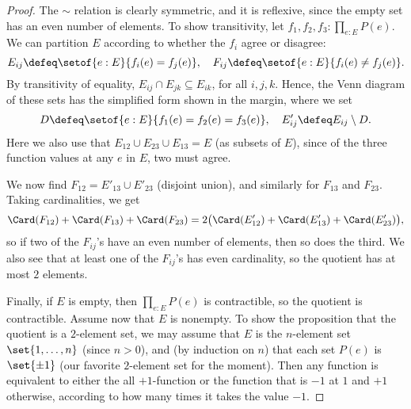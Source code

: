\begin{proof}
  The $\sim$ relation is clearly symmetric, and it is reflexive, since the empty set
  has an even number of elements.
  To show transitivity, let $f_1,f_2,f_3:\prod_{e:E}P(e)$.
  We can partition $E$ according to whether the $f_i$ agree or disagree:
  \[
    E_{ij} \defeq \setof{e:E}{f_i(e) = f_j(e)}, \quad
    F_{ij} \defeq \setof{e:E}{f_i(e) \ne f_j(e)}.
  \]
  By transitivity of equality, $E_{ij} \cap E_{jk} \subseteq E_{ik}$, for all $i,j,k$.
  Hence, the Venn diagram of these sets has the simplified form shown in the margin,
  where we set
  \[
    D \defeq \setof{e:E}{f_1(e)=f_2(e)=f_3(e)}, \quad
    E_{ij}' \defeq E_{ij} \setminus D.
  \]
  Here we also use that $E_{12} \cup E_{23} \cup E_{13} = E$ (as subsets of $E$),
  since of the three function values at any $e$ in $E$, two must agree.

  We now find $F_{12} = E'_{13} \cup E'_{23}$ (disjoint union),
  and similarly for $F_{13}$ and $F_{23}$.
  Taking cardinalities, we get
  \[
    \Card(F_{12})+\Card(F_{13})+\Card(F_{23})
    =2\bigl(\Card(E'_{12})+\Card(E'_{13})+\Card(E'_{23})\bigr),
  \]
  so if two of the $F_{ij}$'s have an even number of elements,
  then so does the third.
  We also see that at least one of the $F_{ij}$'s has even cardinality,
  so the quotient has at most $2$ elements.

  Finally, if $E$ is empty, then $\prod_{e:E}P(e)$ is contractible,
  so the quotient is contractible.
  Assume now that $E$ is nonempty.
  To show the proposition that the quotient is a $2$-element set,
  we may assume that $E$ is the $n$-element set $\set{1,\dots,n}$ (since $n>0$),
  and (by induction on $n$) that each set $P(e)$ is $\set{\pm 1}$
  (our favorite $2$-element set for the moment).
  Then any function is equivalent to either the all $+1$-function
  or the function that is $-1$ at $1$ and $+1$ otherwise,
  according to how many times it takes the value $-1$.
\end{proof}


